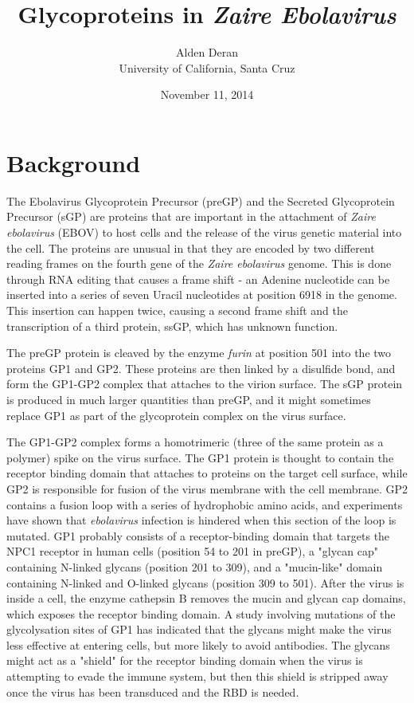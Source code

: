 \documentclass[a4paper,12pt]{article}
\title{Glycoproteins in \textit{Zaire Ebolavirus}}
\date{November 11, 2014}
\author{Alden Deran \\ University of California, Santa Cruz}
\begin{document}
\maketitle

\section{Background}
The Ebolavirus Glycoprotein Precursor (preGP) and the Secreted Glycoprotein Precursor (sGP) are  proteins that are important in the attachment of \textit{Zaire ebolavirus} (EBOV) to host cells and the release of the virus genetic material into the cell.\cite{pmid8622982, pmid21987767} The proteins are unusual in that they are encoded by two different reading frames on the fourth gene of the \textit{Zaire ebolavirus} genome. This is done through RNA editing that causes a frame shift - an Adenine nucleotide can be inserted into a series of seven Uracil nucleotides at position 6918 in the genome. This insertion can happen twice, causing a second frame shift and the transcription of a third protein, ssGP, which has unknown function. \par
The preGP protein is cleaved by the enzyme \textit{furin} at position 501 into the two proteins GP1 and GP2.\cite{pmid24473128} These proteins are then linked by a disulfide bond, and form the GP1-GP2 complex that attaches to the virion surface. \cite{pmid22485110} The sGP protein is produced in much larger quantities than preGP, and it might sometimes replace GP1 as part of the glycoprotein complex on the virus surface.\cite{pmid21987767} \par

The GP1-GP2 complex forms a homotrimeric (three of the same protein as a polymer) spike on the virus surface. The GP1 protein is thought to contain the receptor binding domain that attaches to proteins on the target cell surface, while GP2 is responsible for fusion of the virus membrane with the cell membrane.\cite{pmid25392212} GP2 contains a fusion loop with a series of hydrophobic amino acids, and experiments have shown that \textit{ebolavirus} infection is hindered when this section of the loop is mutated.\cite{pmid24696482}
GP1 probably consists of a receptor-binding domain that targets the NPC1 receptor in human cells (position 54 to 201 in preGP), a "glycan cap" containing N-linked glycans (position 201 to 309), and a "mucin-like" domain containing N-linked and O-linked glycans (position 309 to 501). \cite{pmid24473128} After the virus is inside a cell, the enzyme cathepsin B removes the mucin and glycan cap domains, which exposes the receptor binding domain. A study involving mutations of the glycolysation sites of GP1 has indicated that the glycans might make the virus less effective at entering cells, but more likely to avoid antibodies. \cite{pmid24473128} The glycans might act as a "shield" for the receptor binding domain when the virus is attempting to evade the immune system, but then this shield is stripped away once the virus has been transduced and the RBD is needed.
\end{document}
